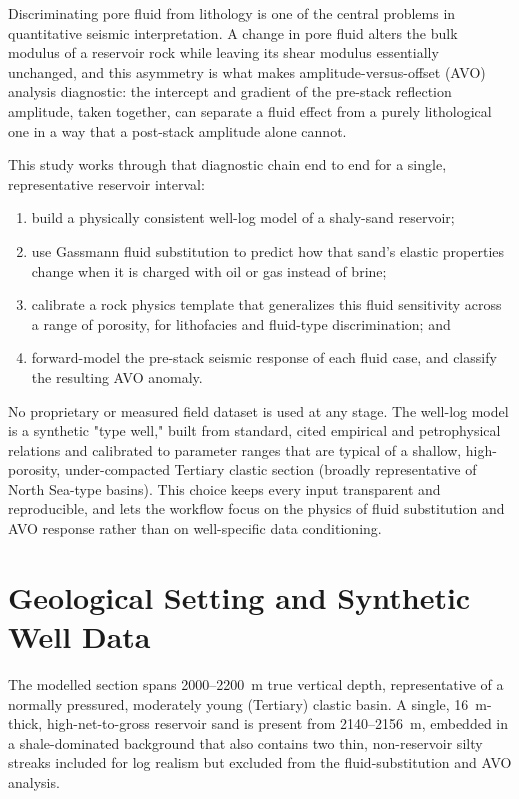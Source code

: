 \documentclass[11pt]{article}
\begin{document}
Discriminating pore fluid from lithology is one of the central problems in quantitative seismic interpretation. A change in pore fluid alters the bulk modulus of a reservoir rock while leaving its shear modulus essentially unchanged, and this asymmetry is what makes amplitude-versus-offset (AVO) analysis diagnostic: the intercept and gradient of the pre-stack reflection amplitude, taken together, can separate a fluid effect from a purely lithological one in a way that a post-stack amplitude alone cannot.

This study works through that diagnostic chain end to end for a single, representative reservoir interval:

\begin{enumerate}[label=(\roman*)]
\item build a physically consistent well-log model of a shaly-sand reservoir;
\item use Gassmann fluid substitution to predict how that sand's elastic properties change when it is charged with oil or gas instead of brine;
\item calibrate a rock physics template that generalizes this fluid sensitivity across a range of porosity, for lithofacies and fluid-type discrimination; and
\item forward-model the pre-stack seismic response of each fluid case, and classify the resulting AVO anomaly.
\end{enumerate}

No proprietary or measured field dataset is used at any stage. The well-log model is a synthetic "type well," built from standard, cited empirical and petrophysical relations and calibrated to parameter ranges that are typical of a shallow, high-porosity, under-compacted Tertiary clastic section (broadly representative of North Sea-type basins). This choice keeps every input transparent and reproducible, and lets the workflow focus on the physics of fluid substitution and AVO response rather than on well-specific data conditioning.

\section{Geological Setting and Synthetic Well Data}

The modelled section spans 2000--2200~m true vertical depth, representative of a normally pressured, moderately young (Tertiary) clastic basin. A single, 16~m-thick, high-net-to-gross reservoir sand is present from 2140--2156~m, embedded in a shale-dominated background that also contains two thin, non-reservoir silty streaks included for log realism but excluded from the fluid-substitution and AVO analysis.
\end{document}
